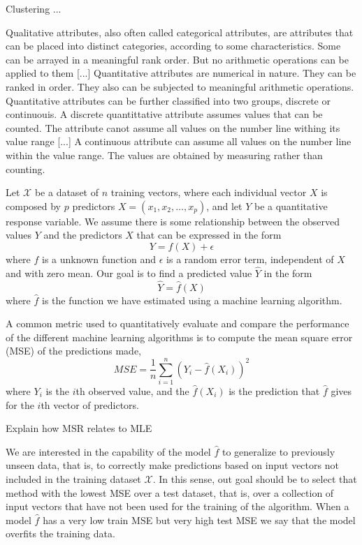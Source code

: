{\color{red} Clustering ...}

{\color{red} Qualitative attributes, also often called categorical attributes, are attributes that can be placed into distinct categories, according to some characteristics. Some can be arrayed in a meaningful rank order. But no arithmetic operations can be applied to them [...] Quantitative attributes are numerical in nature. They can be ranked in order. They also can be subjected to meaningful arithmetic operations. Quantitative attributes can be further classified into two groups, discrete or continuouis. A discrete quantittative attribute assumes values that can be counted. The attribute canot assume all values on the number line withing its value range [...] A continuous attribute can assume all values on the number line within the value range. The values are obtained by measuring rather than counting.}

Let $\mathcal{X}$ be a dataset of $n$ training vectors, where each individual vector $X$ is composed by $p$ predictors $X = \left( x_1, x_2,\ldots, x_p \right)$, and let $Y$ be a quantitative response variable. We assume there is some relationship between the observed values $Y$ and the predictors $X$ that can be expressed in the form
\[
Y = f\left( X \right) + \epsilon
\]
where $f$ is a unknown function and $\epsilon$ is a random error term, independent of $X$ and with zero mean. Our goal is to find a predicted value $\hat{Y}$ in the form
\[
\hat{Y} = \hat{f} \left( X \right)
\]
where $\hat{f}$ is the function we have estimated using a machine learning algorithm.

A common metric used to quantitatively evaluate and compare the performance of the different machine learning algorithms is to compute the mean square error (MSE) of the predictions made, 
\[
MSE = \frac{1}{n} \sum_{i=1}^n \left( Y_i - \hat{f}(X_i) \right) ^ 2
\]
where $Y_i$ is the $i$th observed value, and the $\hat{f}(X_i)$ is the prediction that $\hat{f}$ gives for the $i$th vector of predictors.

{\color{red} Explain how MSR relates to MLE}

We are interested in the capability of the model $\hat{f}$ to generalize to previously unseen data, that is, to correctly make predictions based on input vectors not included in the training dataset $\mathcal{X}$. In this sense, out goal should be to select that method with the lowest MSE over a test dataset, that is, over a collection of input vectors that have not been used for the training of the algorithm. When a model $\hat{f}$ has a very low train MSE but very high test MSE we say that the model overfits the training data.

